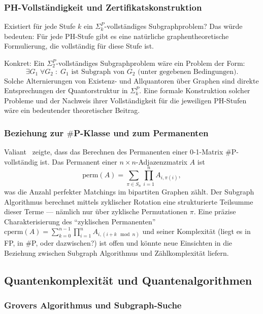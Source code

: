 ﻿\documentclass[a4paper,12pt]{article}
\theoremstyle{definition}
\begin{document}
\subsubsection{PH-Vollständigkeit und Zertifikatskonstruktion}

Existiert für jede Stufe $k$ ein $\Sigma_k^P$-vollständiges Subgraphproblem?
Das würde bedeuten: Für jede PH-Stufe gibt es eine natürliche graphentheoretische
Formulierung, die vollständig für diese Stufe ist.

Konkret: Ein $\Sigma_2^P$-vollständiges Subgraphproblem wäre ein Problem der Form:
\[
  \exists G_1 \;\forall G_2 \;:\; G_1 \text{ ist Subgraph von } G_2 \text{ (unter gegebenen Bedingungen)}.
\]
Solche Alternierungen von Existenz- und Allquantoren über Graphen sind direkte
Entsprechungen der Quantorstruktur in $\Sigma_k^P$.
Eine formale Konstruktion solcher Probleme und der Nachweis ihrer Vollständigkeit
für die jeweiligen PH-Stufen wäre ein bedeutender theoretischer Beitrag.

\subsubsection{Beziehung zur $\#$P-Klasse und zum Permanenten}

Valiant~\cite{valiant1979complexity} zeigte, dass das Berechnen des Permanenten
einer 0-1-Matrix $\#$P-vollständig ist.
Das Permanent einer $n \times n$-Adjazenzmatrix $A$ ist
\[
  \mathrm{perm}(A) = \sum_{\pi \in S_n} \prod_{i=1}^n A_{i,\pi(i)},
\]
was die Anzahl perfekter Matchings im bipartiten Graphen zählt.
Der Subgraph Algorithmus berechnet mittels zyklischer Rotation eine
strukturierte Teilsumme dieser Terme --- nämlich nur über zyklische Permutationen $\pi$.
Eine präzise Charakterisierung des ``zyklischen Permanenten''
$\mathrm{cperm}(A) = \sum_{k=0}^{n-1} \prod_{i=1}^n A_{i,(i+k \mod n)}$
und seiner Komplexität (liegt es in FP, in $\#$P, oder dazwischen?) ist offen
und könnte neue Einsichten in die Beziehung zwischen Subgraph Algorithmus
und Zählkomplexität liefern.

\subsection{Quantenkomplexität und Quantenalgorithmen}

\subsubsection{Grovers Algorithmus und Subgraph-Suche}
\end{document}
